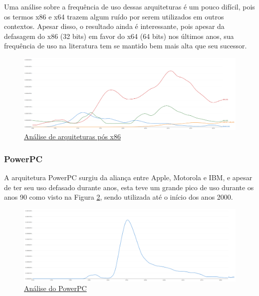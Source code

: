 \documentclass[
	article,			%
	11pt,				%
	oneside,			%
	a4paper,			%
	english,			%
	brazil,				%
	sumario=tradicional
	]{abntex2}
\begin{document}
Uma análise sobre a frequência de uso dessas arquiteturas é um pouco difícil, pois os termos x86 e x64 trazem algum ruído por serem utilizados em outros contextos. Apesar disso, o resultado ainda é interessante, pois apesar da defasagem do x86 (32 bits) em favor do x64 (64 bits) nos últimos anos, sua frequência de uso na literatura tem se mantido bem mais alta que seu sucessor.

\begin{figure}[H]
    \centering
    \includegraphics[width=1\linewidth]{Ngrams/x86_x64.png}
    \caption{\href{https://books.google.com/ngrams/graph?content=80x86\%2Cx86\%2Cx64\%2C\%28x86\%2064\%20\%2B\%20x86_64\%29&year_start=1980&year_end=2022&corpus=en&smoothing=1&case_insensitive=true}{Análise de arquiteturas pós x86}}
    \label{fig:NgramIntelPos86}
\end{figure}

\subsubsection{PowerPC}

A arquitetura PowerPC surgiu da aliança entre Apple, Motorola e IBM, e apesar de ter seu uso defasado durante anos, esta teve um grande pico de uso durante os anos 90 como visto na Figura \ref{fig:NgramPowerPC}, sendo utilizada até o início dos anos 2000.

\begin{figure}[h]
    \centering
    \includegraphics[width=1\linewidth]{Ngrams/PowerPC.png}
    \caption{\href{https://books.google.com/ngrams/graph?content=PowerPC&year_start=1970&year_end=2022&corpus=en&smoothing=1&case_insensitive=false}{Análise do PowerPC}}
    \label{fig:NgramPowerPC}
\end{figure}
\end{document}
